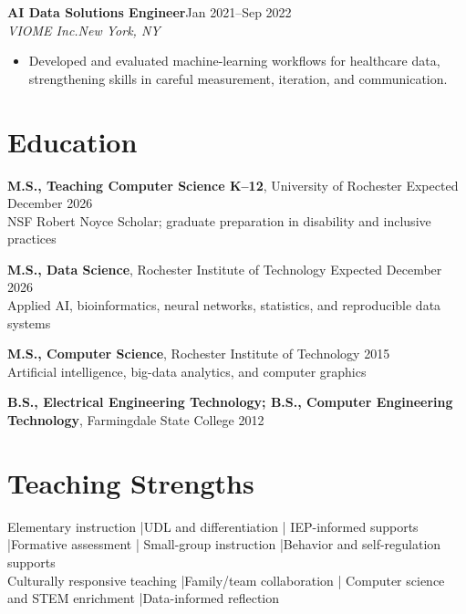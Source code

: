 \documentclass[10pt,letterpaper]{article}
\newcommand{\role}[4]{%
  \textbf{#1}\hfill #2\\
  \textit{#3}\hfill \textit{#4}\vspace{-3pt}
}
\begin{document}
\role{AI Data Solutions Engineer}{Jan 2021--Sep 2022}
{VIOME Inc.}{New York, NY}
\begin{itemize}
  \item Developed and evaluated machine-learning workflows for healthcare data,
    strengthening skills in careful measurement, iteration, and communication.
\end{itemize}

\section*{Education}
\textbf{M.S., Teaching Computer Science K--12}, University of Rochester
\hfill Expected December 2026\\
NSF Robert Noyce Scholar; graduate preparation in disability and inclusive practices

\textbf{M.S., Data Science}, Rochester Institute of Technology
\hfill Expected December 2026\\
Applied AI, bioinformatics, neural networks, statistics, and reproducible data systems

\textbf{M.S., Computer Science}, Rochester Institute of Technology
\hfill 2015\\
Artificial intelligence, big-data analytics, and computer graphics

\textbf{B.S., Electrical Engineering Technology; B.S., Computer Engineering Technology},
Farmingdale State College \hfill 2012

\section*{Teaching Strengths}
Elementary instruction \enspace|\enspace UDL and differentiation \enspace|\enspace
IEP-informed supports \enspace|\enspace Formative assessment \enspace|\enspace
Small-group instruction \enspace|\enspace Behavior and self-regulation supports\\
Culturally responsive teaching \enspace|\enspace Family/team collaboration \enspace|\enspace
Computer science and STEM enrichment \enspace|\enspace Data-informed reflection
\end{document}

